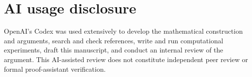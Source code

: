 \documentclass[11pt]{article}
\begin{document}
\section*{AI usage disclosure}
OpenAI's Codex was used extensively to develop the mathematical
construction and arguments, search and check references, write and run
computational experiments, draft this manuscript, and conduct an
internal review of the argument. This AI-assisted review does not
constitute independent peer review or formal proof-assistant verification.
\end{document}
